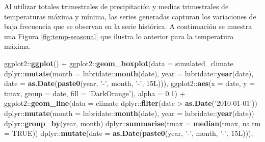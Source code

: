 \documentclass[
  12pt]{article}
\newenvironment{Shaded}{}{}
\newcommand{\DataTypeTok}[1]{\textcolor[rgb]{0.56,0.13,0.00}{#1}}
\newcommand{\FloatTok}[1]{\textcolor[rgb]{0.25,0.63,0.44}{#1}}
\newcommand{\KeywordTok}[1]{\textcolor[rgb]{0.00,0.44,0.13}{\textbf{#1}}}
\newcommand{\NormalTok}[1]{#1}
\newcommand{\OperatorTok}[1]{\textcolor[rgb]{0.40,0.40,0.40}{#1}}
\newcommand{\OtherTok}[1]{\textcolor[rgb]{0.00,0.44,0.13}{#1}}
\newcommand{\StringTok}[1]{\textcolor[rgb]{0.25,0.44,0.63}{#1}}
\begin{document}
Al utilizar totales trimestrales de precipitación y medias trimestrales de temperaturas máxima y mínima, las series generadas capturan los variaciones de baja frecuencia que se observan en la serie histórica. A continuación se muestra una Figura \ref{fig:temp-seasonal} que ilustra lo anterior para la temperatura máxima.

\begin{Shaded}
\begin{Highlighting}[]
\NormalTok{ggplot2}\OperatorTok{::}\KeywordTok{ggplot}\NormalTok{() }\OperatorTok{+}
\StringTok{  }\NormalTok{ggplot2}\OperatorTok{::}\KeywordTok{geom_boxplot}\NormalTok{(}\DataTypeTok{data =}\NormalTok{ simulated_climate }\OperatorTok{%
\StringTok{        }\NormalTok{dplyr}\OperatorTok{::}\KeywordTok{mutate}\NormalTok{(}\DataTypeTok{month =}\NormalTok{ lubridate}\OperatorTok{::}\KeywordTok{month}\NormalTok{(date),}
                      \DataTypeTok{year =}\NormalTok{ lubridate}\OperatorTok{::}\KeywordTok{year}\NormalTok{(date),}
                      \DataTypeTok{date =} \KeywordTok{as.Date}\NormalTok{(}\KeywordTok{paste0}\NormalTok{(year, }\StringTok{'-'}\NormalTok{, month, }\StringTok{'-'}\NormalTok{, 15L))),}
\NormalTok{        ggplot2}\OperatorTok{::}\KeywordTok{aes}\NormalTok{(}\DataTypeTok{x =}\NormalTok{ date, }\DataTypeTok{y =}\NormalTok{ tmax, }
                     \DataTypeTok{group =}\NormalTok{ date, }\DataTypeTok{fill =} \StringTok{'DarkOrange'}\NormalTok{), }
        \DataTypeTok{alpha =} \FloatTok{0.1}\NormalTok{) }\OperatorTok{+}
\StringTok{  }\NormalTok{ggplot2}\OperatorTok{::}\KeywordTok{geom_line}\NormalTok{(}\DataTypeTok{data =}\NormalTok{ climate }\OperatorTok{%
\StringTok{      }\NormalTok{dplyr}\OperatorTok{::}\KeywordTok{filter}\NormalTok{(date }\OperatorTok{>}\StringTok{ }\KeywordTok{as.Date}\NormalTok{(}\StringTok{'2010-01-01'}\NormalTok{)) }\OperatorTok{%
\StringTok{      }\NormalTok{dplyr}\OperatorTok{::}\KeywordTok{mutate}\NormalTok{(}\DataTypeTok{month =}\NormalTok{ lubridate}\OperatorTok{::}\KeywordTok{month}\NormalTok{(date),}
                                     \DataTypeTok{year =}\NormalTok{ lubridate}\OperatorTok{::}\KeywordTok{year}\NormalTok{(date)) }\OperatorTok{%
\StringTok{      }\NormalTok{dplyr}\OperatorTok{::}\KeywordTok{group_by}\NormalTok{(year, month) }\OperatorTok{%
\StringTok{      }\NormalTok{dplyr}\OperatorTok{::}\KeywordTok{summarise}\NormalTok{(}\DataTypeTok{tmax =} \KeywordTok{median}\NormalTok{(tmax, }\DataTypeTok{na.rm =} \OtherTok{TRUE}\NormalTok{)) }\OperatorTok{%
\StringTok{      }\NormalTok{dplyr}\OperatorTok{::}\KeywordTok{mutate}\NormalTok{(}\DataTypeTok{date =} \KeywordTok{as.Date}\NormalTok{(}\KeywordTok{paste0}\NormalTok{(year, }\StringTok{'-'}\NormalTok{, month, }\StringTok{'-'}\NormalTok{, 15L))),}
}}}}}}
\end{Highlighting}
\end{Shaded}
\end{document}

